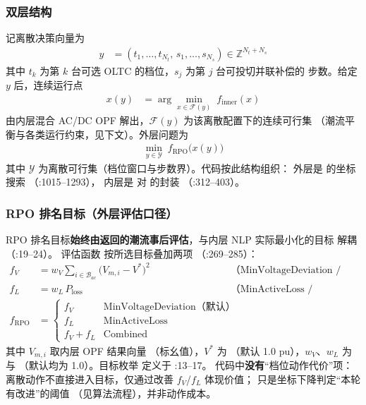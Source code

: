 \subsubsection*{双层结构}
记离散决策向量为
\begin{align*}
y &= (t_1,\ldots,t_{N_t},\,s_1,\ldots,s_{N_s})\in\mathbb{Z}^{N_t+N_s}
\end{align*}
其中 $t_k$ 为第 $k$ 台可选 OLTC 的档位，$s_j$ 为第 $j$ 台可投切并联补偿的
步数。给定 $y$ 后，连续运行点
\begin{align*}
x(y) &= \arg\min_{x\in\mathcal{F}(y)}\; f_{\mathrm{inner}}(x)
\end{align*}
由内层混合 AC/DC OPF 解出，$\mathcal{F}(y)$ 为该离散配置下的连续可行集
（潮流平衡与各类运行约束，见下文）。外层问题为
\begin{align*}
\min_{y\in\mathcal{Y}}\; f_{\mathrm{RPO}}\bigl(x(y)\bigr)
\end{align*}
其中 $\mathcal{Y}$ 为离散可行集（档位窗口与步数界）。代码按此结构组织：
外层是  的坐标搜索
（:1015--1293），
内层是  对  的封装
（:312--403）。

\subsubsection*{RPO 排名目标（外层评估口径）}
RPO 排名目标\textbf{始终由返回的潮流事后评估}，与内层 NLP 实际最小化的目标
解耦（:19--24）。
评估函数  按所选目标叠加两项
（:269--285）：
\begin{align*}
f_V &= w_V\sum_{i\in\mathcal{B}_{ac}} \bigl(V_{m,i}-V^{*}\bigr)^{2}
   && \text{（MinVoltageDeviation / Combined）}\\
f_L &= w_L\,P_{\mathrm{loss}}
   && \text{（MinActiveLoss / Combined）}\\
f_{\mathrm{RPO}} &=
   \begin{cases}
     f_V & \text{MinVoltageDeviation（默认）}\\
     f_L & \text{MinActiveLoss}\\
     f_V + f_L & \text{Combined}
   \end{cases}
\end{align*}
其中 $V_{m,i}$ 取内层 OPF 结果向量 （标幺值），$V^{*}$ 为
（默认 1.0 pu），$w_V$、$w_L$ 为  与
（默认均为 1.0）。目标枚举  定义于
:13--17。
代码中\textbf{没有}“档位动作代价”项：离散动作不直接进入目标，仅通过改善
$f_V$/$f_L$ 体现价值； 只是坐标下降判定“本轮有改进”的阈值
（见算法流程），并非动作成本。

